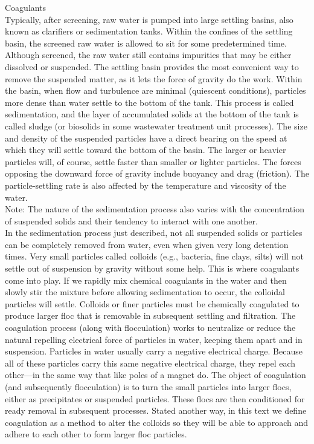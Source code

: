 \documentclass{article}
\begin{document}
Coagulants\\
Typically, after screening, raw water is pumped into large settling basins, also known as clarifiers or sedimentation tanks. Within the confines of the settling basin, the screened raw water is allowed to sit for some predetermined time. Although screened, the raw water still contains impurities that may be either dissolved or suspended. The settling basin provides the most convenient way to remove the suspended matter, as it lets the force of gravity do the work. Within the basin, when flow and turbulence are minimal (quiescent conditions), particles more dense than water settle to the bottom of the tank. This process is called sedimentation, and the layer of accumulated solids at the bottom of the tank is called sludge (or biosolids in some wastewater treatment unit processes). The size and density of the suspended particles have a direct bearing on the speed at which they will settle toward the bottom of the basin. The larger or heavier particles will, of course, settle faster than smaller or lighter particles. The forces opposing the downward force of gravity include buoyancy and drag (friction). The particle-settling rate is also affected by the temperature and viscosity of the water.\\
Note: The nature of the sedimentation process also varies with the concentration of suspended solids and their tendency to interact with one another.\\
In the sedimentation process just described, not all suspended solids or particles can be completely removed from water, even when given very long detention times. Very small particles called colloids (e.g., bacteria, fine clays, silts) will not settle out of suspension by gravity without some help. This is where coagulants come into play. If we rapidly mix chemical coagulants in the water and then slowly stir the mixture before allowing sedimentation to occur, the colloidal particles will settle. Colloids or finer particles must be chemically coagulated to produce larger floc that is removable in subsequent settling and filtration.
The coagulation process (along with flocculation) works to neutralize or reduce the natural repelling electrical force of particles in water, keeping them apart and in suspension. Particles in water usually carry a negative electrical charge. Because all of these particles carry this same negative electrical charge, they repel each other—in the same way that like poles of a magnet do. The object of coagulation (and subsequently flocculation) is to turn the small particles into larger flocs, either as precipitates or suspended particles. These flocs are then conditioned for ready removal in subsequent processes. Stated another way, in this text we define coagulation as a method to alter the colloids so they will be able to approach and adhere to each other to form larger floc particles.\\
\end{document}
